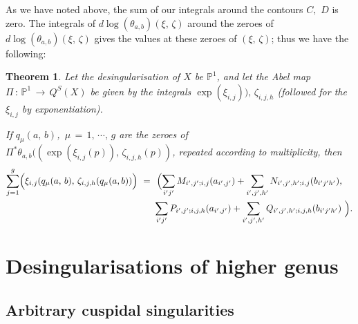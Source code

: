 \documentclass[12pt,reqno]{amsart}
\numberwithin{equation}{section}
\newtheorem{theorem}{Theorem}[section]
\theoremstyle{definition}
\theoremstyle{remark}
\def\bP{{\mathbb {P}}}
\begin{document}
As we have noted above, the sum of our integrals around the contours $C,\,\, D$ is zero. The integrals of 
$d\log(\theta_{a,b})(\xi,\, \zeta)$ around the zeroes of $d\log(\theta_{a,b})(\xi,\, \zeta)$ gives the values at 
these zeroes of $(\xi,\, \zeta)$; thus we have the following:

\begin{theorem} Let the desingularisation of $X$ be $\bP^1$, and  let the Abel map $\Pi\,:\, \bP^1\,
\longrightarrow\, Q^S(X)$ be given by the integrals
$\exp(\xi_{i,j})),\,\zeta_{i,j,h}$ (followed for the $\xi_{i,j}$ by exponentiation).

If $q_\mu(a,\,b)$,\, $\mu\, =\, 1,\, \cdots,\, g$ are the zeroes of $\Pi^*\theta_{a,b}((\exp(\xi_{i,j}(p)),
\,\zeta_{i,j,h}(p))$, repeated according to multiplicity,
then
\begin{align*}\sum_{j=1}^{g} \Bigl(\xi_{i,j}(q_\mu(a,\, b),\, \zeta_{i,j,h}(q_\mu(a, b))  \Bigr ) 
\ =\  &\  \Bigl( \sum_{i'j'} M_{i',j';i,j}(a_{i',j'}) + \sum_{i',j',h'}N_{i',j',h';i,j}(b_{i'j'h'}),\\
&  \sum_{i'j'} P_{i',j';i,j,h}(a_{i',j'}) + \sum_{i',j',h'}Q_{i',j',h';i,j,h}(b_{i'j'h'}) \ \Bigr ). 
\end{align*}
\end{theorem} 

 

\section{Desingularisations  of higher genus}
 
\subsection{Arbitrary cuspidal singularities} 
\end{document}
